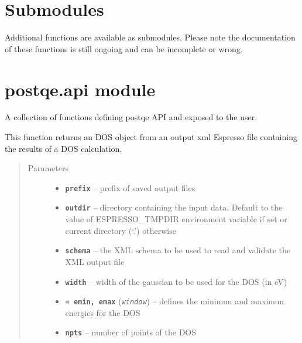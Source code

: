 \documentclass[letterpaper,10pt,english]{sphinxmanual}
\begin{document}
\section{Submodules}
\label{postqe:submodules}
Additional functions are available as submodules. Please note the documentation of these functions is still ongoing and can be incomplete or wrong.


\section{postqe.api module}
\label{postqe:postqe-api-module}\label{postqe:module-postqe.api}
A collection of functions defining postqe API and exposed to the user.

\begin{fulllineitems}
\label{postqe:postqe.api.comput_dos}
This function returns an DOS object from an output xml Espresso file containing the
results of a DOS calculation.
\begin{quote}\begin{description}
\item[{Parameters}] \leavevmode\begin{itemize}
\item {} 
\textbf{\texttt{prefix}} -- prefix of saved output files

\item {} 
\textbf{\texttt{outdir}} -- directory containing the input data. Default to the value of
ESPRESSO\_TMPDIR environment variable if set or current directory (`.') otherwise

\item {} 
\textbf{\texttt{schema}} -- the XML schema to be used to read and validate the XML output file

\item {} 
\textbf{\texttt{width}} -- width of the gaussian to be used for the DOS (in eV)

\item {} 
\textbf{\texttt{= emin, emax}} (\emph{\texttt{window}}) -- defines the minimun and maximun energies for the DOS

\item {} 
\textbf{\texttt{npts}} -- number of points of the DOS


\end{itemize}
\end{description}
\end{quote}
\end{fulllineitems}
\end{document}
